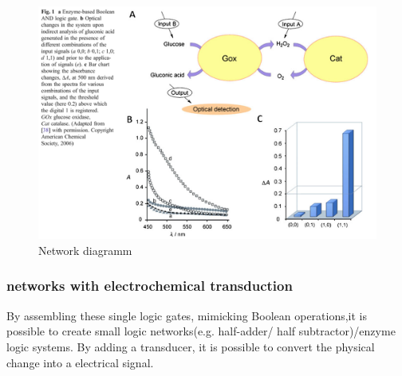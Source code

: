 \documentclass[runningheads]{llncs}
\begin{document}
		\begin{figure}[H] \centering \includegraphics[scale= 0.3]{pics/AND.png} \caption{Network diagramm} \label{img:and} \end{figure}
	
	
	\subsubsection{networks with electrochemical transduction}
		By assembling these single logic gates, mimicking Boolean operations,it is possible to create small logic networks(e.g. half-adder/ half subtractor)/enzyme logic systems. By adding a transducer, it is possible to convert the physical change into a electrical signal.
	
\end{document}
